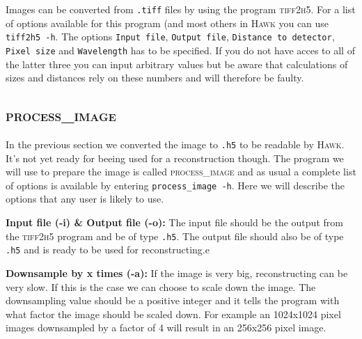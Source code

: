 \documentclass[11pt,a4paper]{article}
\newcommand{\hawk}[1]{\textsc{#1}}
\newcommand{\com}[1]{\texttt{#1}}
\begin{document}
Images can be converted from \com{.tiff} files by using the program \hawk{tiff2h5}. For a list of options available for  this program (and most others in \hawk{Hawk} you can use \com{tiff2h5 -h}. The options \com{Input file}, \com{Output file}, \com{Distance to detector}, \com{Pixel size} and \com{Wavelength} has to be specified. If you do not have acces to all of the latter three you can input arbitrary values but be aware that calculations of sizes and distances rely on these numbers and will therefore be faulty.

\subsection{\hawk{process\_image}}
In the previous section we converted the image to \com{.h5} to be readable by \hawk{Hawk}. It's not yet ready for beeing used for a reconstruction though. The program we will use to prepare the image is called \hawk{process\_image} and as usual a complete list of options is available by entering \com{process\_image -h}. Here we will describe the options that any user is likely to use.

\textbf{Input file (-i) \& Output file (-o):} The input file should be the output from the \hawk{tiff2h5} program and be of type \com{.h5}. The output file should also be of type \com{.h5} and is ready to be used for reconstructing.e

\textbf{Downsample by x times (-a):} If the image is very big, reconstructing can be very slow. If this is the case we can choose to scale down the image. The downsampling value should be a positive integer and it tells the program with what factor the image should be scaled down. For example an 1024x1024 pixel images downsampled by a factor of 4 will result in an 256x256 pixel image.
\end{document}
